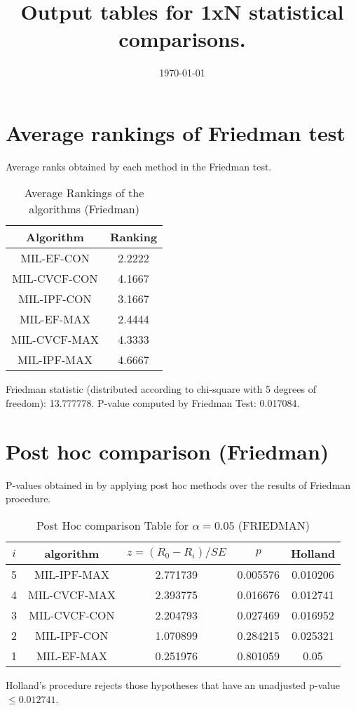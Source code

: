 \documentclass[a4paper,10pt]{article}
\title{Output tables for 1xN statistical comparisons.}
\author{}
\date{\today}
\begin{document}
\begin{landscape}
\pagestyle{empty}
\maketitle
\thispagestyle{empty}

\section{Average rankings of Friedman test}


Average ranks obtained by each method in the Friedman test.

\begin{table}[!htp]
\centering
\begin{tabular}{|c|c|}\hline
Algorithm&Ranking\\\hline
MIL-EF-CON&2.2222\\MIL-CVCF-CON&4.1667\\MIL-IPF-CON&3.1667\\MIL-EF-MAX&2.4444\\MIL-CVCF-MAX&4.3333\\MIL-IPF-MAX&4.6667\\\hline\end{tabular}
\caption{Average Rankings of the algorithms (Friedman)}
\end{table}

Friedman statistic (distributed according to chi-square with 5 degrees of freedom): 13.777778. \newline P-value computed by Friedman Test: 0.017084.\newline


\newpage

\section{Post hoc comparison (Friedman)}


P-values obtained in by applying post hoc methods over the results of Friedman procedure.

\begin{table}[!htp]
\centering\footnotesize
\begin{tabular}{ccccc}
$i$&algorithm&$z=(R_0 - R_i)/SE$&$p$&Holland\\
\hline5&MIL-IPF-MAX&2.771739&0.005576&0.010206\\4&MIL-CVCF-MAX&2.393775&0.016676&0.012741\\3&MIL-CVCF-CON&2.204793&0.027469&0.016952\\2&MIL-IPF-CON&1.070899&0.284215&0.025321\\1&MIL-EF-MAX&0.251976&0.801059&0.05\\\hline
\end{tabular}
\caption{Post Hoc comparison Table for $\alpha=0.05$ (FRIEDMAN)}
\end{table}Holland's procedure rejects those hypotheses that have an unadjusted p-value $\le0.012741$.



\end{landscape}
\end{document}
